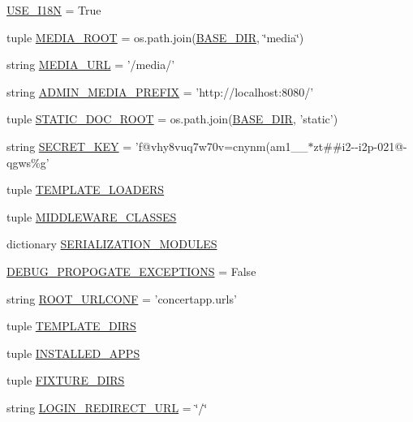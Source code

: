 \begin{DoxyCompactItemize}
\item 
\hyperlink{namespaceconcertapp_1_1settings_af0ee3cb7218c9b148cd422dc8c9baf62}{USE\_\-I18N} = True
\item 
tuple \hyperlink{namespaceconcertapp_1_1settings_ae5c34597fe021f0bef52062cb0a2e2b2}{MEDIA\_\-ROOT} = os.path.join(\hyperlink{namespaceconcertapp_1_1settings_a885ea24527143834f9d5b4a14176ffd0}{BASE\_\-DIR}, \char`\"{}media\char`\"{})
\item 
string \hyperlink{namespaceconcertapp_1_1settings_ab3c2f7d4c5f452700bc088b16ea1e188}{MEDIA\_\-URL} = '/media/'
\item 
string \hyperlink{namespaceconcertapp_1_1settings_ac13404f3fddc64c7cb153abaefcf19ac}{ADMIN\_\-MEDIA\_\-PREFIX} = 'http://localhost:8080/'
\item 
tuple \hyperlink{namespaceconcertapp_1_1settings_aff4e4ddff9aa3f3ca27c553cf9d5d912}{STATIC\_\-DOC\_\-ROOT} = os.path.join(\hyperlink{namespaceconcertapp_1_1settings_a885ea24527143834f9d5b4a14176ffd0}{BASE\_\-DIR}, 'static')
\item 
string \hyperlink{namespaceconcertapp_1_1settings_a3b7aebf7d1ca2d1bd0f91d5568436d6a}{SECRET\_\-KEY} = 'f@vhy8vuq7w70v=cnynm(am1\_\-\_\-$\ast$zt\#\#i2-\/-\/i2p-\/021@-\/qgws\%g'
\item 
tuple \hyperlink{namespaceconcertapp_1_1settings_aa9c92e85f76082a6f35d9634e5a0ed1d}{TEMPLATE\_\-LOADERS}
\item 
tuple \hyperlink{namespaceconcertapp_1_1settings_a7cca7f29901a7569f6ce59f8676ebeaf}{MIDDLEWARE\_\-CLASSES}
\item 
dictionary \hyperlink{namespaceconcertapp_1_1settings_a1c98c7474dcc2ff630908e343d75f069}{SERIALIZATION\_\-MODULES}
\item 
\hyperlink{namespaceconcertapp_1_1settings_af5ecb060423a00d0730d35cf22f97d97}{DEBUG\_\-PROPOGATE\_\-EXCEPTIONS} = False
\item 
string \hyperlink{namespaceconcertapp_1_1settings_a1aabdd985367ce865a3c75bb1e102b0a}{ROOT\_\-URLCONF} = 'concertapp.urls'
\item 
tuple \hyperlink{namespaceconcertapp_1_1settings_a4311c14ccea72ad83d38292bbe2438bd}{TEMPLATE\_\-DIRS}
\item 
tuple \hyperlink{namespaceconcertapp_1_1settings_ac6706d774882b41555116e1e4f878125}{INSTALLED\_\-APPS}
\item 
tuple \hyperlink{namespaceconcertapp_1_1settings_a25f62ec41c28b4b6a4f5b8e471c7b062}{FIXTURE\_\-DIRS}
\item 
string \hyperlink{namespaceconcertapp_1_1settings_ac5a928a667ed8cb8547768d33726fb7c}{LOGIN\_\-REDIRECT\_\-URL} = \char`\"{}/\char`\"{}

\end{DoxyCompactItemize}
